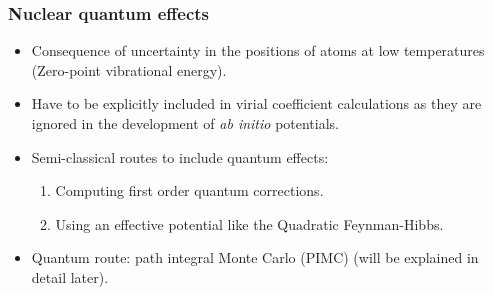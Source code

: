\documentclass[xcolor=svgnames]{beamer}
\DeclareRobustCommand{\abinitio}[0]{\emph{ab initio}}
\begin{document}
        \begin{frame}
            \frametitle{Nuclear quantum effects}
            \begin{itemize}
                \justifying
                \item Consequence of uncertainty in the positions of atoms at low temperatures (Zero-point vibrational energy).
                \item Have to be explicitly included in virial coefficient calculations as they are ignored in the development of \abinitio{} potentials.
                \item Semi-classical routes to include quantum effects:
                    \begin{enumerate}
                        \item Computing first order quantum corrections.
                        \item Using an effective potential like the Quadratic Feynman-Hibbs.
                    \end{enumerate}
                \item Quantum route: path integral Monte Carlo (PIMC) (will be explained in detail later).
            \end{itemize}
        \end{frame}
\end{document}
